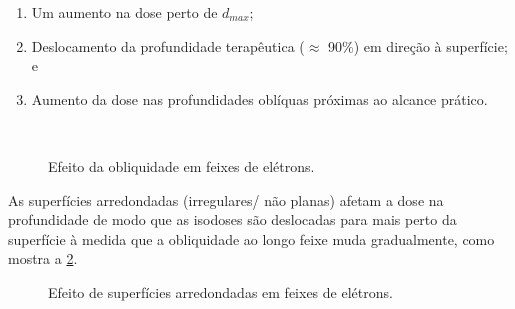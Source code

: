 \documentclass[11pt,a4paper]{article}
\begin{document}
	\begin{enumerate}
		\item Um aumento na dose perto de $d_{max}$;
		\item Deslocamento da profundidade terapêutica ($\approx$ 90\%) em direção à superfície; e
		\item Aumento da dose nas profundidades oblíquas próximas ao alcance prático.
	\end{enumerate}


	\begin{figure}[h]
		\centering
		 \\ %
		\caption{Efeito da obliquidade em feixes de elétrons.}
		\label{fig:obliquidade}
	\end{figure}

	As superfícies arredondadas (irregulares/ não planas) afetam a dose na profundidade de modo que as isodoses são deslocadas para mais perto da superfície à medida que a obliquidade ao longo feixe muda gradualmente, como mostra a \ref{fig:efeitoSuperficieirregular}.

	\begin{figure}[h]
		\centering
		\caption{Efeito de superfícies arredondadas em feixes de elétrons.}
		\label{fig:efeitoSuperficieirregular}
	\end{figure}
\end{document}
